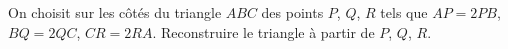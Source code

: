 On choisit sur les côtés du triangle $ABC$ des points $P$, $Q$, $R$ tels que $AP = 2PB$, $BQ = 2QC$, $CR = 2RA$. Reconstruire le triangle à partir de $P$, $Q$, $R$.

